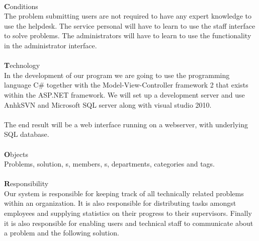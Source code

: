 \ \\
{\Large \textbf{C}}onditions \\ 
The problem submitting users are not required to have any expert knowledge to use the helpdesk. The service personal will have to learn to use the staff interface to solve problems. The administrators will have to learn to use the functionality in the administrator interface.   \\
\ \\
{\Large \textbf{T}}echnology \\
In the development of our program we are going to use the programming language C\# together with the Model-View-Controller framework 2 that exists within the ASP.NET framework. We will set up a development server and use AnhkSVN and Microsoft SQL server along with visual studio 2010.\\
\\
The end result will be a web interface running on a webserver, with underlying SQL database.\\
\ \\
{\Large \textbf{O}}bjects \\
Problems, solution, \aclient s, \astaff members, \admin s, departments, categories and tags. \\
\ \\
{\Large \textbf{R}}esponsibility \\
Our system is responsible for keeping track of all technically related problems within an organization. It is also responsible for distributing tasks amongst employees and supplying statistics on their progress to their supervisors. Finally it is also responsible for enabling users and technical staff to communicate about a problem and the following solution.\\ 
\ \\ 

